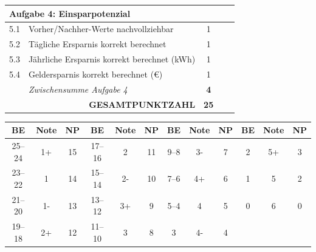 \documentclass[11pt, a4paper]{article}
\begin{document}
\begin{tabularx}{\textwidth}{|p{0.5cm}|X|c|c|c|}
\hline
\hline
\multicolumn{5}{|l|}{\cellcolor{hellgrau}\textbf{Aufgabe 4: Einsparpotenzial}} \\
\hline
5.1 & Vorher/Nachher-Werte nachvollziehbar & 1 & & \\
\hline
5.2 & Tägliche Ersparnis korrekt berechnet & 1 & & \\
\hline
5.3 & Jährliche Ersparnis korrekt berechnet (kWh) & 1 & & \\
\hline
5.4 & Geldersparnis korrekt berechnet (€) & 1 & & \\
\hline
& \textit{Zwischensumme Aufgabe 4} & \textbf{4} & & \\
\hline
\hline
\multicolumn{2}{|r|}{\textbf{GESAMTPUNKTZAHL}} & \textbf{25} & & \\
\hline
\end{tabularx}

\vspace{1.5em}


\begin{tcolorbox}[colback=hellgrau, colframe=physik, title=\textbf{Notenschlüssel (14-Punkte-Skala)}, fonttitle=\bfseries\color{white}, coltitle=white]

\small
\begin{center}
\begin{tabular}{|c|c|c||c|c|c||c|c|c||c|c|c|}
\hline
\textbf{BE} & \textbf{Note} & \textbf{NP} & \textbf{BE} & \textbf{Note} & \textbf{NP} & \textbf{BE} & \textbf{Note} & \textbf{NP} & \textbf{BE} & \textbf{Note} & \textbf{NP} \\
\hline
25--24 & 1+ & 15 & 17--16 & 2 & 11 & 9--8 & 3- & 7 & 2 & 5+ & 3 \\
\hline
23--22 & 1 & 14 & 15--14 & 2- & 10 & 7--6 & 4+ & 6 & 1 & 5 & 2 \\
\hline
21--20 & 1- & 13 & 13--12 & 3+ & 9 & 5--4 & 4 & 5 & 0 & 6 & 0 \\
\hline
19--18 & 2+ & 12 & 11--10 & 3 & 8 & 3 & 4- & 4 & & & \\
\hline
\end{tabular}
\end{center}

\end{tcolorbox}

\vspace{1em}

\end{document}
